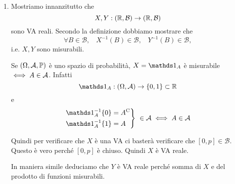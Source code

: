 \ParteSoluzioni

\Soluzione

\begin{enumerate}
\item Mostriamo innanzitutto che
\begin{equation*}
X,Y:(\mathbb{R} ,\mathcal{B})\rightarrow (\mathbb{R} ,\mathcal{B})
\end{equation*}
sono VA reali. Secondo la definizione dobbiamo mostrare che
\begin{equation*}
\forall B\in \mathcal{B} ,\ \ \ \ X^{-1}(B) \in \mathcal{B} ,\ \ \ \ Y^{-1}(B) \in \mathcal{B} ,
\end{equation*}
i.e. $X,Y$ sono misurabili.
\begin{oss}
Se $(\Omega,\mathcal{A},\mathbb{P})$ è uno spazio di probabilità, $X=\Ind_{A}$ è misurabile $\iff A\in \mathcal{A}$. Infatti
\begin{equation*}
\Ind_{A} :(\Omega ,\Ac)\rightarrow \{0,1\} \subset \RR
\end{equation*}
e
\begin{equation*}
\begin{drcases}
\Ind_{A}^{-1}\{0\} =A\complementary\\
\Ind_{A}^{-1}\{1\} =A
\end{drcases}
\ \in \Ac \iff A\in \Ac
\end{equation*}
\end{oss}

Quindi per verificare che $X$ è una VA ci basterà verificare che $[0,p] \in \mathcal{B}$. Questo è vero perché $[0,p]$ è chiuso. Quindi $X$ è VA reale.

In maniera simile deduciamo che $Y$ è VA reale perché somma di $X$ e del prodotto di funzioni misurabili.


\end{enumerate}

